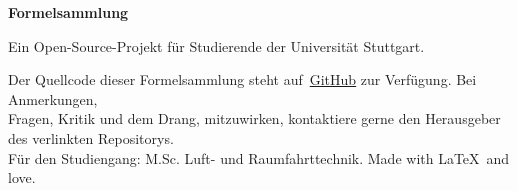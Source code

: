 \thispagestyle{empty}

\centering

\vspace*{88mm}
\begin{minipage}[c][30mm][c]{\textwidth}
    \centering
    \Huge\thetitle
\end{minipage}

\vspace{30mm}
{\Huge\textbf{Formelsammlung}}

\vspace{98mm}
{\large Ein Open-Source-Projekt für Studierende der Universität Stuttgart.}

\vspace*{3mm}
\footnotesize Der Quellcode dieser Formelsammlung steht auf~\href{https://github.com/m4zeRobot/Project-FoSa}{GitHub} zur Verfügung. Bei Anmerkungen,\\
Fragen, Kritik und dem Drang, mitzuwirken, kontaktiere gerne den Herausgeber des verlinkten Repositorys.\\
Für den Studiengang: M.Sc. Luft- und Raumfahrttechnik. Made with \LaTeX~and love.
\newpage
